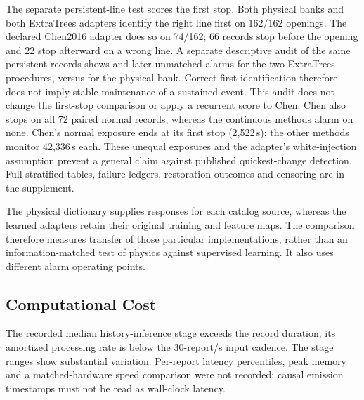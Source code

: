The separate persistent-line test scores the first stop. Both physical
banks and both ExtraTrees adapters identify the right line first on
162/162 openings. The declared Chen2016 adapter does so on 74/162;
66 records stop before the opening and 22 stop afterward on a wrong line.
A separate descriptive audit of the same persistent records shows
\PersistETExtras{} and \PersistShortExtras{} later unmatched alarms for
the two ExtraTrees procedures, versus \PersistPhysicalExtras{} for the
physical bank. Correct first identification therefore does not imply
stable maintenance of a sustained event. This audit does not change the
first-stop comparison or apply a recurrent score to Chen.
Chen also stops on all 72 paired normal records, whereas the continuous
methods alarm on none. Chen's normal exposure ends at its first stop
(2,522\,s); the other methods monitor 42,336\,s each. These unequal
exposures and the adapter's white-injection assumption prevent a general
claim against published quickest-change detection. Full stratified tables,
failure ledgers, restoration outcomes and censoring are in the supplement.

The physical dictionary supplies responses for each catalog source,
whereas the learned adapters retain their original training and feature
maps. The comparison therefore measures transfer of those particular
implementations, rather than an information-matched test of physics
against supervised learning. It also uses different alarm operating points.

\subsection{Computational Cost}

The recorded median history-inference stage exceeds the record duration;
its amortized processing rate is below the 30-report/s input cadence.
The stage ranges show substantial variation. Per-report latency
percentiles, peak memory and a matched-hardware speed comparison were not
recorded; causal emission timestamps must not be read as wall-clock latency.
